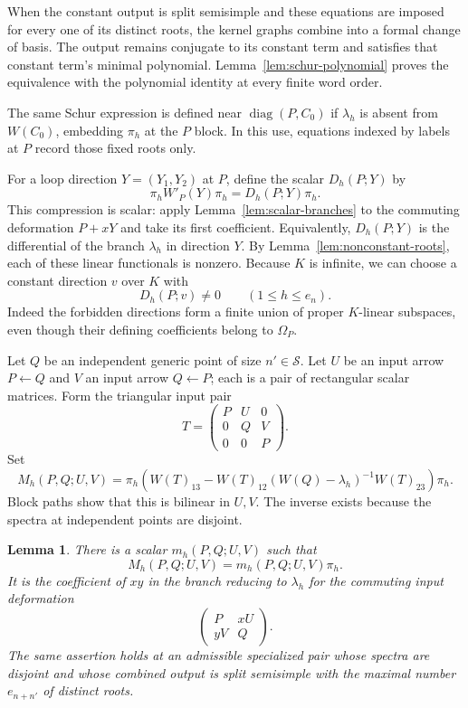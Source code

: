 \documentclass[11pt]{article}
\newtheorem{lemma}[theorem]{Lemma}
\theoremstyle{definition}
\theoremstyle{remark}
\numberwithin{equation}{section}
\begin{document}
When the constant output is split semisimple and these equations are
imposed for every one of its distinct roots, the kernel graphs combine
into a formal change of basis. The output remains conjugate to its
constant term and satisfies that constant term's minimal polynomial.
Lemma~\ref{lem:schur-polynomial} proves the equivalence with the
polynomial identity at every finite word order.

The same Schur expression is defined near $\operatorname{diag}(P,C_0)$
if $\lambda_h$ is absent from $W(C_0)$, embedding $\pi_h$ at the $P$
block. In this use, equations indexed by labels at $P$ record those
fixed roots only.

For a loop direction $Y=(Y_1,Y_2)$ at $P$, define the scalar
$D_h(P;Y)$ by
\begin{equation}
\pi_h W'_P(Y)\pi_h=D_h(P;Y)\pi_h.
 \label{eq:loop-response}
\end{equation}
This compression is scalar: apply Lemma~\ref{lem:scalar-branches}
to the commuting deformation $P+xY$ and take its first coefficient.
Equivalently, $D_h(P;Y)$ is the differential of the branch
$\lambda_h$ in direction $Y$.  By
Lemma~\ref{lem:nonconstant-roots}, each of these linear functionals is
nonzero.  Because $K$ is infinite, we can choose a constant direction
$v$ over $K$ with
\begin{equation}
D_h(P;v)\ne0\qquad(1\le h\le e_n).
 \label{eq:nonzero-direction}
\end{equation}
Indeed the forbidden directions form a finite union of proper
$K$-linear subspaces, even though their defining coefficients belong
to $\Omega_P$.

Let $Q$ be an independent generic point of size $n'\in\mathcal S$.
Let $U$ be an input arrow $P\leftarrow Q$ and $V$ an input arrow
$Q\leftarrow P$; each is a pair of rectangular scalar matrices.
Form the triangular input pair
\[
 T=\begin{pmatrix}P&U&0\\0&Q&V\\0&0&P\end{pmatrix}.
\]
Set
\begin{equation}
M_h(P,Q;U,V)=\pi_h\left(
 W(T)_{13}
 -W(T)_{12}(W(Q)-\lambda_h)^{-1}W(T)_{23}
 \right)\pi_h.
 \label{eq:paired-response}
\end{equation}
Block paths show that this is bilinear in $U,V$.  The inverse exists
because the spectra at independent points are disjoint.

\begin{lemma}\label{lem:paired-scalar}
There is a scalar $m_h(P,Q;U,V)$ such that
\[
 M_h(P,Q;U,V)=m_h(P,Q;U,V)\pi_h.
\]
It is the coefficient of $xy$ in the branch reducing to $\lambda_h$
for the commuting input deformation
\[
 \begin{pmatrix}P&xU\\yV&Q\end{pmatrix}.
\]
The same assertion holds at an admissible specialized pair whose
spectra are disjoint and whose combined output is split semisimple
with the maximal number $e_{n+n'}$ of distinct roots.
\end{lemma}
\end{document}
